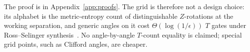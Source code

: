 The proof is in Appendix~\ref{app:proofs}.  The grid is therefore not a design
choice: its alphabet is the metric-entropy count of distinguishable
$Z$-rotations at the working separation, and generic angles on it cost
$\Theta(\log(1/\epsilon))$ $T$ gates under Ross--Selinger
synthesis~\cite[Alg.~9.9]{ross2016optimal}.  No angle-by-angle $T$-count
equality is claimed; special grid points, such as Clifford angles, are
cheaper.
